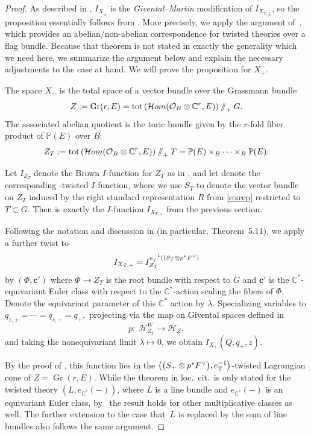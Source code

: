 \documentclass[11pt]{article}
\numberwithin{equation}{section}
\numberwithin{equation}{section}
\newcommand{\cc}[1]{\mathcal{#1}} %
\newcommand{\CC}{\mathbb{C}}
\newcommand{\PP}{\mathbb{P}}
\newcommand{\torus}{\mathbb{T}}
\DeclareMathOperator{\tot}{tot}
\DeclareMathOperator{\Gr}{Gr}
\newcommand{\F}{F}
\newcommand{\E}{E}
\begin{document}
\begin{proof}

As described in \cite{CLS}, $I_{X_\pm}$ is the \emph{Givental--Martin} modification of $I_{X_{T, \pm}}$, so the proposition essentially follows from \cite[Theorem 1.11]{CLS}.
More precisely, we apply the argument of~\mbox{\cite[Theorem~5.11]{CLS}}, which provides an abelian/non-abelian correspondence for twisted theories over a flag bundle. Because that theorem is not stated in exactly the generality which we need here, we summarize the argument below and explain the necessary adjustments to the case at hand. We will prove the proposition for $X_+$.

The space $X_+$ is the total space of a vector bundle over the Grassmann bundle
\[
Z := \Gr(r, \E) = \tot\left(\mathcal{H}{\rm om}(\cc O_B \otimes \CC^r, \E)\right) \sslash_+ G.
\]
The associated abelian quotient is the toric bundle given by the $r$-fold fiber product of $\PP(\E)$ over $B$:
\[
Z_T := \tot\left(\mathcal{H}{\rm om}(\cc O_B \otimes \CC^r, \E)\right) \sslash_+ T = \PP(\E) \times_B \cdots \times_B \PP(\E).
\]

Let $I_{Z_T}$ denote the Brown $I$-function for $Z_T$ as in \cite{Brown}, and let
\smash{$I_{Z_T}^{e_\torus^{-1}( (S_T \otimes p^*\F^\vee))}$} denote the corresponding
\smash{$\bigl(\bigl(S_T \otimes p^*\F^\vee\bigr), {\rm e}^{-1}_{\torus}(-)\bigr)$}-twisted $I$-function, where we use $S_T$ to denote the vector bundle on $Z_T$ induced by the right standard representation $R$ from \eqref{e:srep} restricted to $T \subset G$. Then \raisebox{-1pt}{\smash{$I_{Z_T}^{e_\torus^{-1}( (S_T \otimes p^*\F^\vee))}$}} is exactly the $I$-function $I_{X_{T,+}}$ from the previous section.

Following the notation and discussion in \cite[Section~5.2]{CLS} (in particular, Theorem~5.11), we apply a further twist to
\[
I_{X_{T,+}} = I_{Z_T}^{ {\rm e}^{-1}_{\torus}( (S_T \otimes p^*\F^\vee)}
\]
by $(\Phi, \mathbf c')$ where $\Phi \to Z_T$ is the root bundle with respect to $G$ and $\mathbf c'$ is the $\CC^*$-equivariant Euler class
with respect to the $\CC^*$-action scaling the fibers of $\Phi$. Denote the equivariant parameter of this $\CC^*$ action by $\lambda$. Specializing variables to
$q_{1, +} = \cdots = q_{s, +} = q_+,$
projecting via the map on Givental spaces defined in \cite{CLS}
\[
p\colon \ \mathcal{H}_{Z_T}^W \to \mathcal{H}_{Z},
\]
and taking the nonequivariant limit $\lambda \mapsto 0$, we obtain $I_{X_+}(Q, q_+, z)$.


By the proof of \cite[Theorem~5.11]{CLS}, this function lies in the $\bigl(\bigl(S_+ \otimes p^*\F^\vee\bigr), {\rm e}^{-1}_{\torus}\bigr)$-twisted Lagrangian cone of $Z = \Gr(r, \E)$. While the theorem in loc.~cit.\ is only stated for the twisted theory $( L, e_{\CC^*}(-))$, where $L$ is a line bundle and $e_{\CC^*}(-)$ is an equivariant Euler class, by~\mbox{\cite[Remark 3.7]{CLS}} the result holds for other multiplicative classes as well. The further extension to the case that~$L$ is replaced by the sum of line bundles also follows the same argument.


\end{proof}
\end{document}
